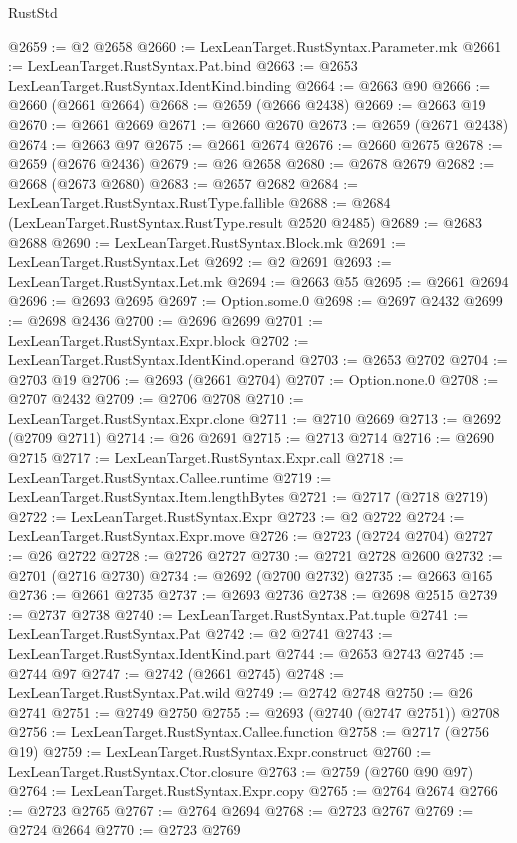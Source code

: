 \begin{lexlean}{RustStd}
\begin{coremodule}
{\begin{coremodule}
{{{{{{{{{{{{{{{{{{{{{{{{{{{{{{{{{{{{{{{@2659 := @2 @2658
@2660 := LexLeanTarget.RustSyntax.Parameter.mk
@2661 := LexLeanTarget.RustSyntax.Pat.bind
@2663 := @2653 LexLeanTarget.RustSyntax.IdentKind.binding
@2664 := @2663 @90
@2666 := @2660 (@2661 @2664)
@2668 := @2659 (@2666 @2438)
@2669 := @2663 @19
@2670 := @2661 @2669
@2671 := @2660 @2670
@2673 := @2659 (@2671 @2438)
@2674 := @2663 @97
@2675 := @2661 @2674
@2676 := @2660 @2675
@2678 := @2659 (@2676 @2436)
@2679 := @26 @2658
@2680 := @2678 @2679
@2682 := @2668 (@2673 @2680)
@2683 := @2657 @2682
@2684 := LexLeanTarget.RustSyntax.RustType.fallible
@2688 := @2684 (LexLeanTarget.RustSyntax.RustType.result @2520 @2485)
@2689 := @2683 @2688
@2690 := LexLeanTarget.RustSyntax.Block.mk
@2691 := LexLeanTarget.RustSyntax.Let
@2692 := @2 @2691
@2693 := LexLeanTarget.RustSyntax.Let.mk
@2694 := @2663 @55
@2695 := @2661 @2694
@2696 := @2693 @2695
@2697 := Option.some.{0}
@2698 := @2697 @2432
@2699 := @2698 @2436
@2700 := @2696 @2699
@2701 := LexLeanTarget.RustSyntax.Expr.block
@2702 := LexLeanTarget.RustSyntax.IdentKind.operand
@2703 := @2653 @2702
@2704 := @2703 @19
@2706 := @2693 (@2661 @2704)
@2707 := Option.none.{0}
@2708 := @2707 @2432
@2709 := @2706 @2708
@2710 := LexLeanTarget.RustSyntax.Expr.clone
@2711 := @2710 @2669
@2713 := @2692 (@2709 @2711)
@2714 := @26 @2691
@2715 := @2713 @2714
@2716 := @2690 @2715
@2717 := LexLeanTarget.RustSyntax.Expr.call
@2718 := LexLeanTarget.RustSyntax.Callee.runtime
@2719 := LexLeanTarget.RustSyntax.Item.lengthBytes
@2721 := @2717 (@2718 @2719)
@2722 := LexLeanTarget.RustSyntax.Expr
@2723 := @2 @2722
@2724 := LexLeanTarget.RustSyntax.Expr.move
@2726 := @2723 (@2724 @2704)
@2727 := @26 @2722
@2728 := @2726 @2727
@2730 := @2721 @2728 @2600
@2732 := @2701 (@2716 @2730)
@2734 := @2692 (@2700 @2732)
@2735 := @2663 @165
@2736 := @2661 @2735
@2737 := @2693 @2736
@2738 := @2698 @2515
@2739 := @2737 @2738
@2740 := LexLeanTarget.RustSyntax.Pat.tuple
@2741 := LexLeanTarget.RustSyntax.Pat
@2742 := @2 @2741
@2743 := LexLeanTarget.RustSyntax.IdentKind.part
@2744 := @2653 @2743
@2745 := @2744 @97
@2747 := @2742 (@2661 @2745)
@2748 := LexLeanTarget.RustSyntax.Pat.wild
@2749 := @2742 @2748
@2750 := @26 @2741
@2751 := @2749 @2750
@2755 := @2693 (@2740 (@2747 @2751)) @2708
@2756 := LexLeanTarget.RustSyntax.Callee.function
@2758 := @2717 (@2756 @19)
@2759 := LexLeanTarget.RustSyntax.Expr.construct
@2760 := LexLeanTarget.RustSyntax.Ctor.closure
@2763 := @2759 (@2760 @90 @97)
@2764 := LexLeanTarget.RustSyntax.Expr.copy
@2765 := @2764 @2674
@2766 := @2723 @2765
@2767 := @2764 @2694
@2768 := @2723 @2767
@2769 := @2724 @2664
@2770 := @2723 @2769
}}}}}}}}}}}}}}}}}}}}}}}}}}}}}}}}}}}}}}}
\end{coremodule}}
\end{coremodule}
\end{lexlean}
